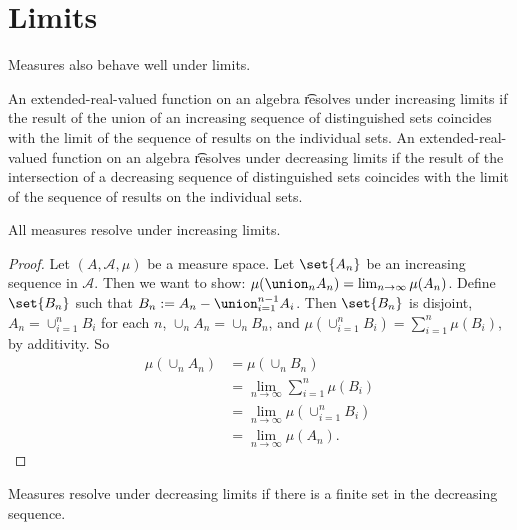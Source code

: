 \section*{Limits}

Measures also behave well under limits.

An extended-real-valued function on an algebra \t{resolves under increasing limits} if the result of the union of an increasing sequence of distinguished sets coincides with the limit of the sequence of results on the individual sets.
An extended-real-valued function on an algebra \t{resolves under decreasing limits} if the result of the intersection of a decreasing sequence of distinguished sets coincides with the limit of the sequence of results on the individual sets.

\begin{proposition}
All measures resolve under increasing limits.\end{proposition}
\begin{proof}Let $(A, \mathcal{A} , \mu )$ be a measure space.
Let $\set{A_n}$ be an increasing sequence in $\mathcal{A} $.
Then we want to show:
$\mu (\union_{n} A_n) = \lim_{n \to \infty} \mu (A_n)$.
Define $\set{B_n}$ such that
$B_n := A_n - \union_{i = 1}^{n-1} A_i$.
Then $\set{B_n}$ is disjoint, $A_n = \cup_{i = 1}^{n} B_i$ for each $n$, $\cup_n A_n = \cup_n B_n$, and $\mu (\cup_{i = 1}^{n} B_i) = \sum_{i = 1}^{n} \mu (B_i)$, by additivity.
So
    \[
\begin{aligned}
\mu (\cup_n A_n)
&= \mu (\cup_n B_n) \\
&= \lim_{n \to \infty} \sum_{i = 1}^{n} \mu (B_i) \\
&= \lim_{n \to \infty} \mu (\cup_{i = 1}^{n} B_i) \\
&= \lim_{n \to \infty} \mu (A_n).
\end{aligned}
    \]
\end{proof}
\begin{proposition}
Measures resolve under decreasing
limits if there is a finite set in
the decreasing sequence.\end{proposition}
